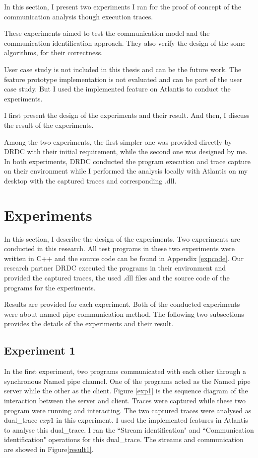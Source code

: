 


\label{chapter:Exp}
In this section, I present two experiments I ran for the proof of concept of the communication analysis though execution traces.

These experiments aimed to test the communication model and the communication identification approach. They also verify the design of the some algorithms, for their correctness.  

User case study is not included in this thesis and can be the future work. The feature prototype implementation is not evaluated and can be part of the user case study. But I used the implemented feature on Atlantis to conduct the experiments.

I first present the design of the experiments and their result. And then, I discuss the result of the experiments.  

Among the two experiments, the first simpler one was provided directly by DRDC with their initial requirement, while the second one was designed by me. In both experiments, DRDC conducted the program execution and trace capture on their environment while I performed the analysis locally with Atlantis on my desktop with the captured traces and corresponding .dll.

\section{Experiments}
In this section, I describe the design of the experiments. Two experiments are conducted in this research. All test programs in these two experiments were written in C++ and the source code can be found in Appendix \ref{expcode}. Our research partner DRDC executed the programs in their environment and provided the captured traces, the used .dll files and the source code of the programs for the experiments.

Results are provided for each experiment. Both of the conducted experiments were about named pipe communication method. The following two subsections provides the details of the experiments and their result.

\subsection{Experiment 1}
In the first experiment, two programs communicated with each other through a synchronous Named pipe channel. One of the programs acted as the Named pipe server while the other as the client. Figure \ref{exp1} is the sequence diagram of the interaction between the server and client. Traces were captured while these two program were running and interacting. The two captured traces were analysed as dual\_trace $exp1$ in this experiment. I used the implemented features in Atlantis to analyse this dual\_trace. I ran the ``Stream identification" and ``Communication identification" operations for this dual\_trace. The streams and communication are showed in Figure\ref{result1}.

